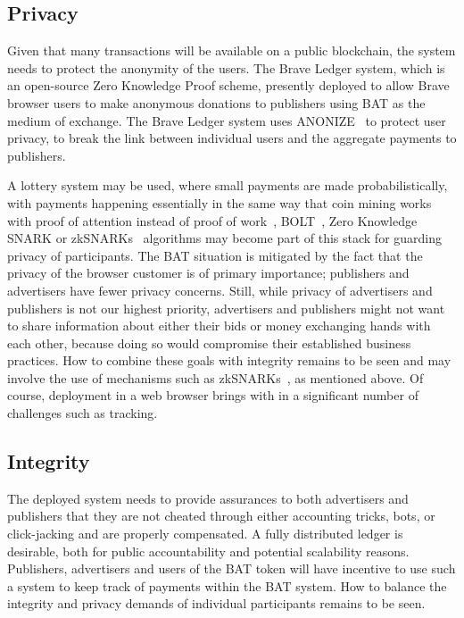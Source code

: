 \documentclass[twocolumn,9pt]{article}
\newcommand{\bat}{\textsf{BAT}\xspace}
\begin{document}
\subsection{Privacy} 
Given that many transactions will be available on a public blockchain, the system needs to protect the anonymity of the users.
The Brave Ledger system, which is an open-source Zero Knowledge Proof scheme, presently deployed to allow Brave browser users to make anonymous donations to publishers using \bat as the medium of exchange. The Brave Ledger system uses ANONIZE~\cite{anonize} to protect user privacy, to break the link between individual users and the aggregate payments to publishers. 

A lottery system may be used, where small payments are made probabilistically, with payments happening essentially in the same way that coin mining works with proof of attention instead of proof of work~\cite{micropayments,decentralized-anonymous}, BOLT~\cite{bolt}, Zero Knowledge SNARK or zkSNARKs~\cite{Reitwiessner2016} algorithms may become part of this stack for guarding privacy of participants. The \bat situation is mitigated by the fact that the privacy of the browser customer is of primary importance; publishers and advertisers have fewer privacy concerns. 
Still, while privacy of advertisers and publishers is not our highest priority, advertisers and publishers might not want to share information about either their bids or money exchanging hands with each other, because doing so would compromise their established business practices. How to combine these goals with integrity remains to be seen and may involve the use of mechanisms such as zkSNARKs~\cite{Reitwiessner2016}, as mentioned above.
Of course, deployment in a web browser brings with in a significant number of challenges such as tracking.%

\subsection{Integrity}
The deployed system needs to provide assurances to both advertisers and publishers that they are not cheated through either accounting tricks, bots, or click-jacking and are properly compensated. 
A fully distributed ledger is desirable, both for public accountability and potential scalability reasons. Publishers, advertisers and users of the \bat token will have incentive to use such a system to keep track of payments within the \bat system. 
How to balance the integrity and privacy demands of individual participants remains to be seen. 
\end{document}
